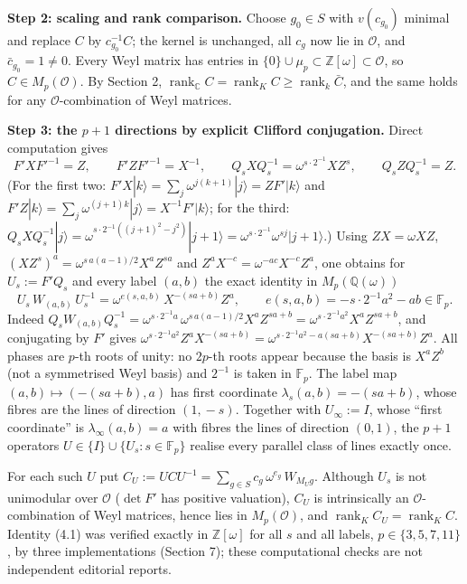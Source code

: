 \documentclass[
  11pt,
  a4paper,
]{article}
\begin{document}
\textbf{Step 2: scaling and rank comparison.} Choose \(g_0\in S\) with
\(v(c_{g_0})\) minimal and replace \(C\) by \(c_{g_0}^{-1}C\); the
kernel is unchanged, all \(c_g\) now lie in \(\mathcal O\), and
\(\bar c_{g_0}=1\ne0\). Every Weyl matrix has entries in
\(\{0\}\cup\mu_p\subset\mathbb Z[\omega]\subset\mathcal O\), so
\(C\in M_p(\mathcal O)\). By Section 2,
\(\operatorname{rank}_{\mathbb C}C=\operatorname{rank}_KC\ge\operatorname{rank}_k\bar C\),
and the same holds for any \(\mathcal O\)-combination of Weyl matrices.

\textbf{Step 3: the \(p+1\) directions by explicit Clifford
conjugation.} Direct computation gives
\[F'XF'^{-1}=Z,\qquad F'ZF'^{-1}=X^{-1},\qquad Q_sXQ_s^{-1}=\omega^{s\cdot2^{-1}}XZ^s,\qquad Q_sZQ_s^{-1}=Z.\]
(For the first two:
\(F'X|k\rangle=\sum_j\omega^{j(k+1)}|j\rangle=ZF'|k\rangle\) and
\(F'Z|k\rangle=\sum_j\omega^{(j+1)k}|j\rangle=X^{-1}F'|k\rangle\); for
the third:
\(Q_sXQ_s^{-1}|j\rangle=\omega^{s\cdot2^{-1}((j+1)^2-j^2)}|j+1\rangle=\omega^{s\cdot2^{-1}}\omega^{sj}|j+1\rangle\).)
Using \(ZX=\omega XZ\), \((XZ^s)^a=\omega^{s\,\allowbreak{}a(a-1)/2}X^aZ^{sa}\) and
\(Z^aX^{-c}=\omega^{-ac}X^{-c}Z^a\), one obtains for \(U_s:=F'Q_s\) and
every label \((a,\allowbreak{}b)\) the exact identity in \(M_p(\mathbb Q(\omega))\)
\[U_s\,W_{(a,b)}\,U_s^{-1}=\omega^{e(s,a,b)}\,X^{-(sa+b)}Z^{a},\qquad e(s,a,b)=-s\cdot2^{-1}a^2-ab\in\mathbb F_p.\tag{4.1}\]
Indeed
\(Q_sW_{(a,\allowbreak{}b)}Q_s^{-1}=\omega^{s\cdot2^{-1}a}\,\allowbreak{}\omega^{s\,\allowbreak{}a(a-1)/2}X^aZ^{sa+b}=\omega^{s\cdot2^{-1}a^2}X^aZ^{sa+b}\),
and conjugating by \(F'\) gives
\(\omega^{s\cdot2^{-1}a^2}Z^aX^{-(sa+b)}=\omega^{s\cdot2^{-1}a^2-a(sa+b)}X^{-(sa+b)}Z^a\).
All phases are \(p\)-th roots of unity: no \(2p\)-th roots appear
because the basis is \(X^aZ^b\) (not a symmetrised Weyl basis) and
\(2^{-1}\) is taken in \(\mathbb F_p\). The label map
\((a,\allowbreak{}b)\mapsto(-(sa+b),\allowbreak{}a)\) has first coordinate
\(\lambda_s(a,\allowbreak{}b)=-(sa+b)\), whose fibres are the lines of direction
\((1,\allowbreak{}-s)\). Together with \(U_\infty:=I\), whose ``first coordinate'' is
\(\lambda_\infty(a,\allowbreak{}b)=a\) with fibres the lines of direction \((0,\allowbreak{}1)\),
the \(p+1\) operators \(U\in\{I\}\cup\{U_s:s\in\mathbb F_p\}\) realise
every parallel class of lines exactly once.

For each such \(U\) put
\(C_U:=UCU^{-1}=\sum_{g\in S}c_g\,\allowbreak{}\omega^{e_g}\,\allowbreak{}W_{M_Ug}\). Although
\(U_s\) is not unimodular over \(\mathcal O\) (\(\det F'\) has positive
valuation), \(C_U\) is intrinsically an \(\mathcal O\)-combination of
Weyl matrices, hence lies in \(M_p(\mathcal O)\), and
\(\operatorname{rank}_KC_U=\operatorname{rank}_KC\). Identity (4.1) was
verified exactly in \(\mathbb Z[\omega]\) for all \(s\) and all labels,
\(p\in\{3,\allowbreak{}5,\allowbreak{}7,\allowbreak{}11\}\), by three implementations (Section 7); these
computational checks are not independent editorial reports.
\end{document}

